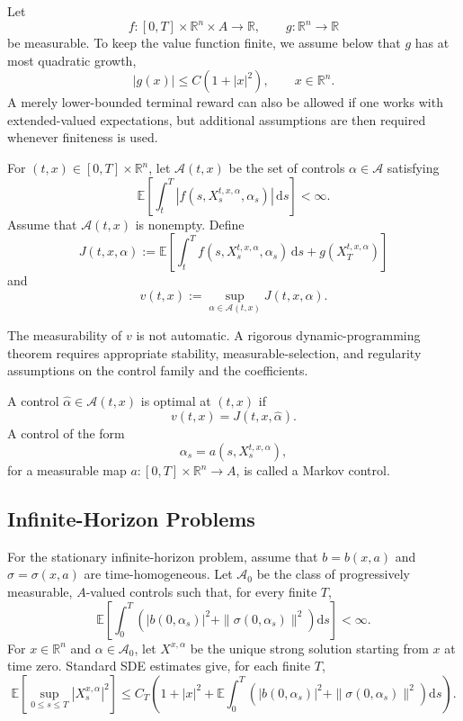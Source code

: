 Let
\[
f:[0,T]\times\mathbb R^n\times A\to\mathbb R,
\qquad
g:\mathbb R^n\to\mathbb R
\]
be measurable. To keep the value function finite, we assume below that \(g\) has at most quadratic growth,
\[
|g(x)|\le C(1+|x|^2),
\qquad x\in\mathbb R^n.
\]
A merely lower-bounded terminal reward can also be allowed if one works with extended-valued expectations, but additional assumptions are then required whenever finiteness is used.

\begin{de}
For \((t,x)\in[0,T]\times\mathbb R^n\), let \(\mathcal A(t,x)\) be the set of controls \(\alpha\in\mathcal A\) satisfying
\[
\mathbb E\!\left[
\int_t^T
|f(s,X_s^{t,x,\alpha},\alpha_s)|\,\mathrm ds
\right]<\infty.
\]
Assume that \(\mathcal A(t,x)\) is nonempty. Define
\[
J(t,x,\alpha)
:=\mathbb E\!\left[
\int_t^T
f(s,X_s^{t,x,\alpha},\alpha_s)\,\mathrm ds
+g(X_T^{t,x,\alpha})
\right]
\]
and
\[
v(t,x)
:=\sup_{\alpha\in\mathcal A(t,x)}J(t,x,\alpha).
\]
\end{de}

\begin{remark}
The measurability of \(v\) is not automatic. A rigorous dynamic-programming theorem requires appropriate stability, measurable-selection, and regularity assumptions on the control family and the coefficients.
\end{remark}

\begin{de}
A control \(\hat\alpha\in\mathcal A(t,x)\) is optimal at \((t,x)\) if
\[
v(t,x)=J(t,x,\hat\alpha).
\]
A control of the form
\[
\alpha_s=a(s,X_s^{t,x,\alpha}),
\]
for a measurable map \(a:[0,T]\times\mathbb R^n\to A\), is called a Markov control.
\end{de}

\subsection{Infinite-Horizon Problems}

For the stationary infinite-horizon problem, assume that \(b=b(x,a)\) and \(\sigma=\sigma(x,a)\) are time-homogeneous. Let \(\mathcal A_0\) be the class of progressively measurable, \(A\)-valued controls such that, for every finite \(T\),
\[
\mathbb E\!\left[
\int_0^T
\left(
|b(0,\alpha_s)|^2
+\|\sigma(0,\alpha_s)\|^2
\right)\mathrm ds
\right]<\infty.
\]
For \(x\in\mathbb R^n\) and \(\alpha\in\mathcal A_0\), let \(X^{x,\alpha}\) be the unique strong solution starting from \(x\) at time zero. Standard SDE estimates give, for each finite \(T\),
\[
\mathbb E\!\left[
\sup_{0\le s\le T}|X_s^{x,\alpha}|^2
\right]
\le C_T\left(
1+|x|^2
+\mathbb E\int_0^T
\left(
|b(0,\alpha_s)|^2
+\|\sigma(0,\alpha_s)\|^2
\right)\mathrm ds
\right).
\]

